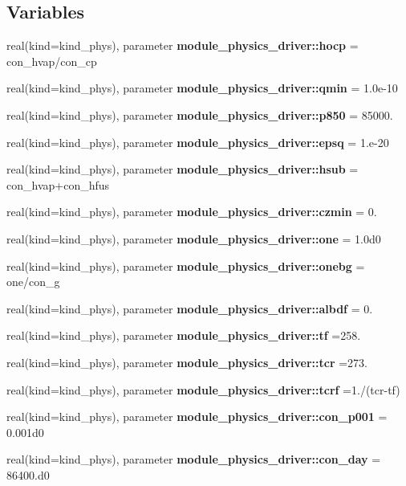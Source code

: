 \subsection*{Variables}
\begin{DoxyCompactItemize}
\item 
real(kind=kind\+\_\+phys), parameter \textbf{ module\+\_\+physics\+\_\+driver\+::hocp} = con\+\_\+hvap/con\+\_\+cp
\item 
real(kind=kind\+\_\+phys), parameter \textbf{ module\+\_\+physics\+\_\+driver\+::qmin} = 1.\+0e-\/10
\item 
real(kind=kind\+\_\+phys), parameter \textbf{ module\+\_\+physics\+\_\+driver\+::p850} = 85000.
\item 
real(kind=kind\+\_\+phys), parameter \textbf{ module\+\_\+physics\+\_\+driver\+::epsq} = 1.e-\/20
\item 
real(kind=kind\+\_\+phys), parameter \textbf{ module\+\_\+physics\+\_\+driver\+::hsub} = con\+\_\+hvap+con\+\_\+hfus
\item 
real(kind=kind\+\_\+phys), parameter \textbf{ module\+\_\+physics\+\_\+driver\+::czmin} = 0.
\item 
real(kind=kind\+\_\+phys), parameter \textbf{ module\+\_\+physics\+\_\+driver\+::one} = 1.\+0d0
\item 
real(kind=kind\+\_\+phys), parameter \textbf{ module\+\_\+physics\+\_\+driver\+::onebg} = one/con\+\_\+g
\item 
real(kind=kind\+\_\+phys), parameter \textbf{ module\+\_\+physics\+\_\+driver\+::albdf} = 0.
\item 
real(kind=kind\+\_\+phys), parameter \textbf{ module\+\_\+physics\+\_\+driver\+::tf} =258.
\item 
real(kind=kind\+\_\+phys), parameter \textbf{ module\+\_\+physics\+\_\+driver\+::tcr} =273.
\item 
real(kind=kind\+\_\+phys), parameter \textbf{ module\+\_\+physics\+\_\+driver\+::tcrf} =1./(tcr-\/tf)
\item 
real(kind=kind\+\_\+phys), parameter \textbf{ module\+\_\+physics\+\_\+driver\+::con\+\_\+p001} = 0.\+001d0
\item 
real(kind=kind\+\_\+phys), parameter \textbf{ module\+\_\+physics\+\_\+driver\+::con\+\_\+day} = 86400.d0
\end{DoxyCompactItemize}
